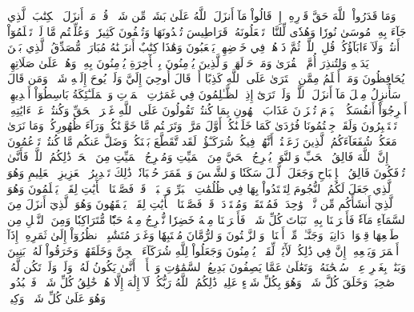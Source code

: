 وَمَا قَدَرُواْ ٱللَّهَ حَقَّ قَدۡرِهِۦٓ إِذۡ قَالُواْ مَآ أَنزَلَ ٱللَّهُ عَلَىٰ بَشَرٖ مِّن شَيۡءٖۗ قُلۡ مَنۡ أَنزَلَ ٱلۡكِتَٰبَ ٱلَّذِي جَآءَ بِهِۦ مُوسَىٰ نُورٗا وَهُدٗى لِّلنَّاسِۖ تَجۡعَلُونَهُۥ قَرَاطِيسَ تُبۡدُونَهَا وَتُخۡفُونَ كَثِيرٗاۖ وَعُلِّمۡتُم مَّا لَمۡ تَعۡلَمُوٓاْ أَنتُمۡ وَلَآ ءَابَآؤُكُمۡۖ قُلِ ٱللَّهُۖ ثُمَّ ذَرۡهُمۡ فِي خَوۡضِهِمۡ يَلۡعَبُونَ
وَهَٰذَا كِتَٰبٌ أَنزَلۡنَٰهُ مُبَارَكٞ مُّصَدِّقُ ٱلَّذِي بَيۡنَ يَدَيۡهِ وَلِتُنذِرَ أُمَّ ٱلۡقُرَىٰ وَمَنۡ حَوۡلَهَاۚ وَٱلَّذِينَ يُؤۡمِنُونَ بِٱلۡأٓخِرَةِ يُؤۡمِنُونَ بِهِۦۖ وَهُمۡ عَلَىٰ صَلَاتِهِمۡ يُحَافِظُونَ
وَمَنۡ أَظۡلَمُ مِمَّنِ ٱفۡتَرَىٰ عَلَى ٱللَّهِ كَذِبًا أَوۡ قَالَ أُوحِيَ إِلَيَّ وَلَمۡ يُوحَ إِلَيۡهِ شَيۡءٞ وَمَن قَالَ سَأُنزِلُ مِثۡلَ مَآ أَنزَلَ ٱللَّهُۗ وَلَوۡ تَرَىٰٓ إِذِ ٱلظَّـٰلِمُونَ فِي غَمَرَٰتِ ٱلۡمَوۡتِ وَٱلۡمَلَـٰٓئِكَةُ بَاسِطُوٓاْ أَيۡدِيهِمۡ أَخۡرِجُوٓاْ أَنفُسَكُمُۖ ٱلۡيَوۡمَ تُجۡزَوۡنَ عَذَابَ ٱلۡهُونِ بِمَا كُنتُمۡ تَقُولُونَ عَلَى ٱللَّهِ غَيۡرَ ٱلۡحَقِّ وَكُنتُمۡ عَنۡ ءَايَٰتِهِۦ تَسۡتَكۡبِرُونَ
وَلَقَدۡ جِئۡتُمُونَا فُرَٰدَىٰ كَمَا خَلَقۡنَٰكُمۡ أَوَّلَ مَرَّةٖ وَتَرَكۡتُم مَّا خَوَّلۡنَٰكُمۡ وَرَآءَ ظُهُورِكُمۡۖ وَمَا نَرَىٰ مَعَكُمۡ شُفَعَآءَكُمُ ٱلَّذِينَ زَعَمۡتُمۡ أَنَّهُمۡ فِيكُمۡ شُرَكَـٰٓؤُاْۚ لَقَد تَّقَطَّعَ بَيۡنَكُمۡ وَضَلَّ عَنكُم مَّا كُنتُمۡ تَزۡعُمُونَ
۞إِنَّ ٱللَّهَ فَالِقُ ٱلۡحَبِّ وَٱلنَّوَىٰۖ يُخۡرِجُ ٱلۡحَيَّ مِنَ ٱلۡمَيِّتِ وَمُخۡرِجُ ٱلۡمَيِّتِ مِنَ ٱلۡحَيِّۚ ذَٰلِكُمُ ٱللَّهُۖ فَأَنَّىٰ تُؤۡفَكُونَ
فَالِقُ ٱلۡإِصۡبَاحِ وَجَعَلَ ٱلَّيۡلَ سَكَنٗا وَٱلشَّمۡسَ وَٱلۡقَمَرَ حُسۡبَانٗاۚ ذَٰلِكَ تَقۡدِيرُ ٱلۡعَزِيزِ ٱلۡعَلِيمِ
وَهُوَ ٱلَّذِي جَعَلَ لَكُمُ ٱلنُّجُومَ لِتَهۡتَدُواْ بِهَا فِي ظُلُمَٰتِ ٱلۡبَرِّ وَٱلۡبَحۡرِۗ قَدۡ فَصَّلۡنَا ٱلۡأٓيَٰتِ لِقَوۡمٖ يَعۡلَمُونَ
وَهُوَ ٱلَّذِيٓ أَنشَأَكُم مِّن نَّفۡسٖ وَٰحِدَةٖ فَمُسۡتَقَرّٞ وَمُسۡتَوۡدَعٞۗ قَدۡ فَصَّلۡنَا ٱلۡأٓيَٰتِ لِقَوۡمٖ يَفۡقَهُونَ
وَهُوَ ٱلَّذِيٓ أَنزَلَ مِنَ ٱلسَّمَآءِ مَآءٗ فَأَخۡرَجۡنَا بِهِۦ نَبَاتَ كُلِّ شَيۡءٖ فَأَخۡرَجۡنَا مِنۡهُ خَضِرٗا نُّخۡرِجُ مِنۡهُ حَبّٗا مُّتَرَاكِبٗا وَمِنَ ٱلنَّخۡلِ مِن طَلۡعِهَا قِنۡوَانٞ دَانِيَةٞ وَجَنَّـٰتٖ مِّنۡ أَعۡنَابٖ وَٱلزَّيۡتُونَ وَٱلرُّمَّانَ مُشۡتَبِهٗا وَغَيۡرَ مُتَشَٰبِهٍۗ ٱنظُرُوٓاْ إِلَىٰ ثَمَرِهِۦٓ إِذَآ أَثۡمَرَ وَيَنۡعِهِۦٓۚ إِنَّ فِي ذَٰلِكُمۡ لَأٓيَٰتٖ لِّقَوۡمٖ يُؤۡمِنُونَ
وَجَعَلُواْ لِلَّهِ شُرَكَآءَ ٱلۡجِنَّ وَخَلَقَهُمۡۖ وَخَرَقُواْ لَهُۥ بَنِينَ وَبَنَٰتِۭ بِغَيۡرِ عِلۡمٖۚ سُبۡحَٰنَهُۥ وَتَعَٰلَىٰ عَمَّا يَصِفُونَ
بَدِيعُ ٱلسَّمَٰوَٰتِ وَٱلۡأَرۡضِۖ أَنَّىٰ يَكُونُ لَهُۥ وَلَدٞ وَلَمۡ تَكُن لَّهُۥ صَٰحِبَةٞۖ وَخَلَقَ كُلَّ شَيۡءٖۖ وَهُوَ بِكُلِّ شَيۡءٍ عَلِيمٞ
ذَٰلِكُمُ ٱللَّهُ رَبُّكُمۡۖ لَآ إِلَٰهَ إِلَّا هُوَۖ خَٰلِقُ كُلِّ شَيۡءٖ فَٱعۡبُدُوهُۚ وَهُوَ عَلَىٰ كُلِّ شَيۡءٖ وَكِيلٞ
